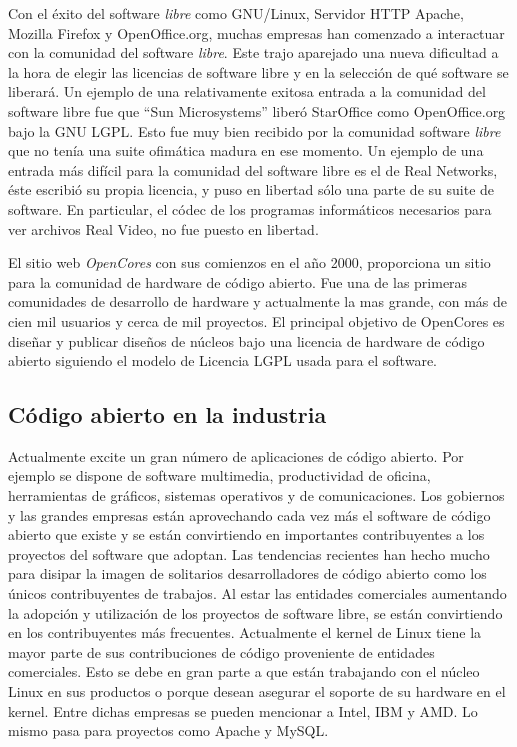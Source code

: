 Con el éxito del software \textit{libre} como GNU/Linux, Servidor HTTP
Apache, Mozilla Firefox y OpenOffice.org, muchas empresas han
comenzado a interactuar con la comunidad del software
\textit{libre}. Este trajo aparejado una nueva dificultad a la hora de
elegir las licencias de software libre y en la selección de qué
software se liberará. Un ejemplo de una relativamente exitosa entrada
a la comunidad del software libre fue que ``Sun Microsystems'' liberó
StarOffice como OpenOffice.org bajo la GNU LGPL. Esto fue muy bien
recibido por la comunidad software \textit{libre} que no tenía una
suite ofimática madura en ese momento. Un ejemplo de una entrada más
difícil para la comunidad del software libre es el de Real Networks,
éste escribió su propia licencia, y puso en libertad sólo una parte de
su suite de software. En particular, el códec de los programas
informáticos necesarios para ver archivos Real Video, no fue puesto en
libertad.

El sitio web \textit{OpenCores} con sus comienzos en el año 2000,
proporciona un sitio para la comunidad de hardware de código abierto.
Fue una de las primeras comunidades de desarrollo de hardware y
actualmente la mas grande, con más de cien mil usuarios y cerca de mil
proyectos. El principal objetivo de OpenCores es diseñar y publicar
diseños de núcleos bajo una licencia de hardware de código abierto
siguiendo el modelo de Licencia LGPL usada para el software.

\subsection{Código abierto en la industria}

Actualmente excite un gran número de aplicaciones de código
abierto. Por ejemplo se dispone de software multimedia, productividad
de oficina, herramientas de gráficos, sistemas operativos y de
comunicaciones. Los gobiernos y las grandes empresas están
aprovechando cada vez más el software de código abierto que existe y
se están convirtiendo en importantes contribuyentes a los proyectos
del software que adoptan. Las tendencias recientes han hecho mucho
para disipar la imagen de solitarios desarrolladores de código abierto
como los únicos contribuyentes de trabajos. Al estar las entidades
comerciales aumentando la adopción y utilización de los proyectos de
software libre, se están convirtiendo en los contribuyentes más
frecuentes. Actualmente el kernel de Linux tiene la mayor parte de sus
contribuciones de código proveniente de entidades comerciales. Esto se
debe en gran parte a que están trabajando con el núcleo Linux en sus
productos o porque desean asegurar el soporte de su hardware en el
kernel. Entre dichas empresas se pueden mencionar a Intel, IBM y
AMD. Lo mismo pasa para proyectos como Apache y MySQL.

